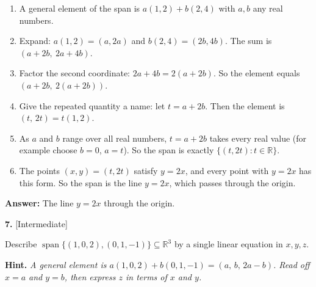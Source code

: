 \documentclass[11pt]{article}
\begin{document}
\begin{tcolorbox}[breakable,colback=ans,colframe=ansb,boxrule=0.5pt,left=4pt,right=4pt,top=2pt,bottom=2pt]\begin{enumerate}[leftmargin=2.2em,itemsep=1pt,topsep=1pt,label=\textbf{Step \arabic*.}]\item A general element of the span is $a(1,2)+b(2,4)$ with $a,b$ any real numbers.
\item Expand: $a(1,2)=(a,2a)$ and $b(2,4)=(2b,4b)$. The sum is $(a+2b,\ 2a+4b)$.
\item Factor the second coordinate: $2a+4b=2(a+2b)$. So the element equals $(a+2b,\ 2(a+2b))$.
\item Give the repeated quantity a name: let $t=a+2b$. Then the element is $(t,\,2t)=t(1,2)$.
\item As $a$ and $b$ range over all real numbers, $t=a+2b$ takes every real value (for example choose $b=0$, $a=t$). So the span is exactly $\{(t,2t):t\in\mathbb{R}\}$.
\item The points $(x,y)=(t,2t)$ satisfy $y=2x$, and every point with $y=2x$ has this form. So the span is the line $y=2x$, which passes through the origin.
\end{enumerate}\textbf{Answer:} The line $y=2x$ through the origin.\end{tcolorbox}
\par\vspace{2pt}
\begin{minipage}{\linewidth}\textbf{7.} \hfill{\scriptsize\color{ink}[Intermediate]}\par\nopagebreak Describe $\operatorname{span}\{(1,0,2),(0,1,-1)\}\subseteq\mathbb{R}^{3}$ by a single linear equation in $x,y,z$.
\par\smallskip\begingroup\small\color{ink}\textbf{Hint.} \textit{A general element is $a(1,0,2)+b(0,1,-1)=(a,\,b,\,2a-b)$. Read off $x=a$ and $y=b$, then express $z$ in terms of $x$ and $y$.}\endgroup
\end{minipage}\par\nopagebreak
\end{document}
